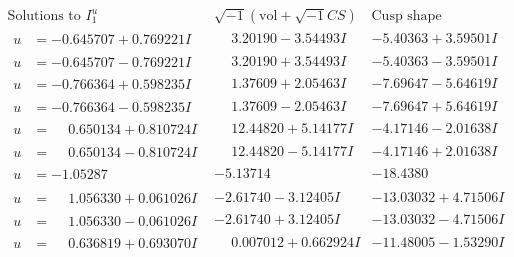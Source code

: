 \documentclass[1p]{elsarticle_modified}
\theoremstyle{definition}
\newcommand{\I}{\sqrt{-1}}
\begin{document}
$$\begin{array}{c|c|c}  
\text{Solutions to }I^u_{1}& \I (\text{vol} + \sqrt{-1}CS) & \text{Cusp shape}\\
 \hline 
\begin{aligned}
u &= -0.645707 + 0.769221 I\end{aligned}
 & \phantom{-}3.20190 - 3.54493 I & -5.40363 + 3.59501 I \\ \hline\begin{aligned}
u &= -0.645707 - 0.769221 I\end{aligned}
 & \phantom{-}3.20190 + 3.54493 I & -5.40363 - 3.59501 I \\ \hline\begin{aligned}
u &= -0.766364 + 0.598235 I\end{aligned}
 & \phantom{-}1.37609 + 2.05463 I & -7.69647 - 5.64619 I \\ \hline\begin{aligned}
u &= -0.766364 - 0.598235 I\end{aligned}
 & \phantom{-}1.37609 - 2.05463 I & -7.69647 + 5.64619 I \\ \hline\begin{aligned}
u &= \phantom{-}0.650134 + 0.810724 I\end{aligned}
 & \phantom{-}12.44820 + 5.14177 I & -4.17146 - 2.01638 I \\ \hline\begin{aligned}
u &= \phantom{-}0.650134 - 0.810724 I\end{aligned}
 & \phantom{-}12.44820 - 5.14177 I & -4.17146 + 2.01638 I \\ \hline\begin{aligned}
u &= -1.05287\phantom{ +0.000000I}\end{aligned}
 & -5.13714\phantom{ +0.000000I} & -18.4380\phantom{ +0.000000I} \\ \hline\begin{aligned}
u &= \phantom{-}1.056330 + 0.061026 I\end{aligned}
 & -2.61740 - 3.12405 I & -13.03032 + 4.71506 I \\ \hline\begin{aligned}
u &= \phantom{-}1.056330 - 0.061026 I\end{aligned}
 & -2.61740 + 3.12405 I & -13.03032 - 4.71506 I \\ \hline\begin{aligned}
u &= \phantom{-}0.636819 + 0.693070 I\end{aligned}
 & \phantom{-}0.007012 + 0.662924 I & -11.48005 - 1.53290 I \\ \hline\begin{aligned}

\end{aligned}
\end{array}$$
\end{document}
